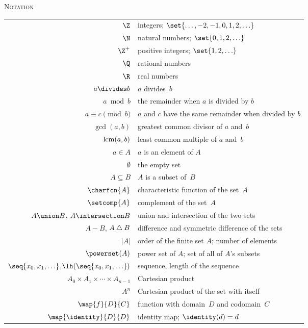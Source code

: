 \documentclass{ibl}
\begin{document}
\newpage
\vspace*{\fill}
\begin{center}
  \renewcommand{\arraystretch}{1.07}
  {\large\textsc{Notation}} \\[3ex]
  \begin{tabular}{r|l}
    $\Z$    &integers; $\set{\ldots, -2,-1,0,1,2,\ldots}$  \\
    $\N$    &natural numbers; $\set{0,1,2,\ldots}$  \\
    $\Z^+$  &positive integers; $\set{1,2,\ldots}$  \\
    $\Q$    &rational numbers  \\
    $\R$    &real numbers     \\
    $a\divides b$  &$a$ divides~$b$ \\
    $a\bmod b$  &the remainder when $a$ is divided by $b$ \\
    $a\equiv c\pmod b$ &$a$ and $c$ have the same remainder when divided by $b$ \\
    $\gcd(a,b)$ &greatest common divisor of $a$ and~$b$  \\
    $\operatorname{lcm}(a,b)$ &least common multiple of $a$ and~$b$  \\
    $a\in A$  &$a$ is an element of $A$  \\
    $\emptyset$  &the empty set  \\
    $A\subseteq B$ &$A$ is a subset of~$B$  \\
    $\charfcn{A}$  &characteristic function of the set~$A$ \\
    $\setcomp{A}$  &complement of the set~$A$  \\
    $A\union B$, $A\intersection B$ &union and intersection of the two sets \\
    $A- B$, $A\mathbin{\triangle} B$ &difference and symmetric difference of the sets \\
    $|A|$  &order of the finite set $A$; number of elements \\ 
    $\powerset(A)$  &power set of $A$; set of all of $A$'s subsets \\
    $\seq{x_0,x_1,\ldots}$,$\lh(\seq{x_0,x_1,\ldots})$ &sequence, length of the sequence   \\
    $A_0\times A_1\times \cdots \times A_{n-1}$  &Cartesian product \\
    $A^n$  &Cartesian product of the set with itself  \\
    $\map{f}{D}{C}$  &function with domain~$D$ and codomain~$C$ \\
    $\map{\identity}{D}{D}$  &identity map; $\identity(d)=d$ \\

\end{tabular}
\end{center}
\end{document}
